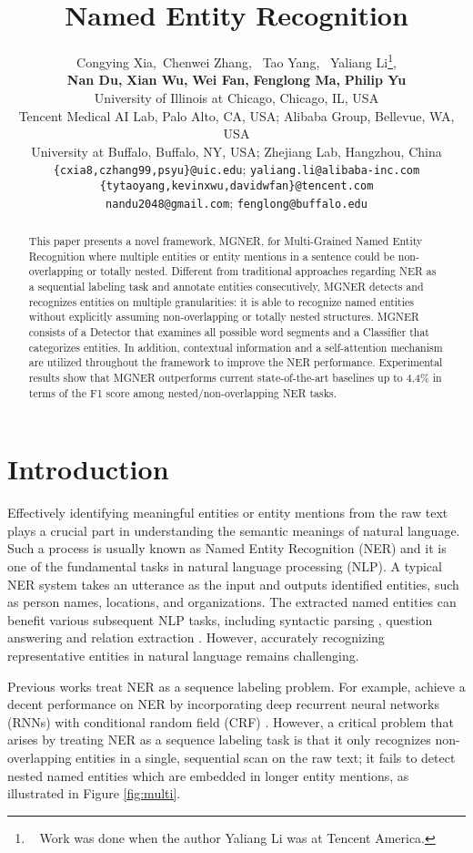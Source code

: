 \documentclass[11pt,a4paper]{article}
\title{{\multi} Named Entity Recognition}
\author{Congying Xia{},~Chenwei Zhang{}, ~Tao Yang, ~Yaliang Li\thanks{~ Work was done when the author Yaliang Li was at Tencent America.},\\
\textbf{Nan Du}\textbf{,} \textbf{Xian Wu}\textbf{,} \textbf{Wei Fan}\textbf{,} \textbf{Fenglong Ma}\textbf{,} \textbf{Philip Yu}{}\\
  {University of Illinois at Chicago, Chicago, IL, USA} \\
  {Tencent Medical AI Lab, Palo Alto, CA, USA};
    {Alibaba Group, Bellevue, WA, USA}\\
    {University at Buffalo, Buffalo, NY, USA};
   {Zhejiang Lab, Hangzhou, China}\\
  {\tt \{cxia8,czhang99,psyu\}@uic.edu};  
   {\tt yaliang.li@alibaba-inc.com} \\
  {\tt \{tytaoyang,kevinxwu,davidwfan\}@tencent.com}\\
 {\tt nandu2048@gmail.com};
  {\tt fenglong@buffalo.edu} \\
}
\date{}
\newcommand{\ModelName}{\textsc{MGNER}}
\newcommand{\multi}{Multi-Grained}
\begin{document}
\maketitle
\begin{abstract}
This paper presents a novel framework, {\ModelName}, for {\multi} Named Entity Recognition where multiple entities or entity mentions in a sentence could be non-overlapping or totally nested. 
Different from traditional approaches regarding NER as a sequential labeling task and annotate entities consecutively, {\ModelName} detects and recognizes entities on multiple granularities: it is able to recognize named entities without explicitly assuming non-overlapping or totally nested structures.
{\ModelName} consists of a Detector that examines all possible word segments and a Classifier that categorizes entities.
In addition, contextual information and a self-attention mechanism are utilized throughout the framework to improve the NER performance.
Experimental results show that {\ModelName} outperforms current state-of-the-art baselines up to 4.4\% in terms of the F1 score among nested/non-overlapping NER tasks.
\end{abstract}


\section{Introduction}
Effectively identifying meaningful entities or entity mentions from the raw text plays a crucial part in understanding the semantic meanings of natural language. Such a process is usually known as Named Entity Recognition (NER) and it is one of the fundamental tasks in natural language processing (NLP). A typical NER system takes an utterance as the input and outputs identified entities, such as person names, locations, and organizations. The extracted named entities can benefit various subsequent NLP tasks, including syntactic parsing \cite{koo2010efficient}, question answering \cite{krishnamurthy2015learning} and relation extraction \cite{lao2010relational}. However, accurately recognizing representative entities in natural language remains challenging.

Previous works treat NER as a sequence labeling problem. For example, \citet{lample2016neural} achieve a decent performance on NER by incorporating deep recurrent neural networks (RNNs) with conditional random field (CRF) \cite{lafferty2001conditional}.
However, a critical problem that arises by treating NER as a sequence labeling task is that it only recognizes non-overlapping entities in a single, sequential scan on the raw text; it fails to detect nested named entities which are embedded in longer entity mentions, as illustrated in Figure \ref{fig:multi}. 
\end{document}
